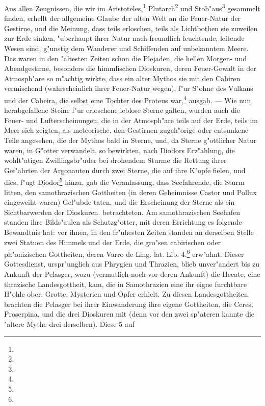 \documentclass[a4paper, 11pt, oneside, polutonikogreek, german]{article}
\begin{document}
Aus allen Zeugnissen, die wir im Aristoteles,\footnote{} Plutarch\footnote{} und Stob"aus\footnote{} gesammelt finden, erhellt der allgemeine Glaube der alten Welt an die Feuer-Natur der Gestirne, und die Meinung, dass teils erloschen, teils als Lichtbothen sie zuweilen zur Erde sinken, "uberhaupt ihrer Natur nach freundlich leuchtende, leitende Wesen sind, g"unstig dem Wanderer und Schiffenden auf unbekanntem Meere. Das waren in den "altesten Zeiten schon die Plejaden, die hellen Morgen- und Abendgestirne, besonders die himmlischen Dioskuren, deren Feuer-Gewalt in der Atmosph"are so m"achtig wirkte, dass ein alter Mythos sie mit den Cabiren vermischend (wahrscheinlich ihrer Feuer-Natur wegen), f"ur S"ohne des Vulkans und der Cabeira, die selbst eine Tochter des Proteus war,\footnote{} ausgab. --- Wie nun herabgefallene Steine f"ur erloschene leblose Sterne galten, wurden auch die Feuer- und Lufterscheinungen, die in der Atmosph"are teils auf der Erde, teils im Meer sich zeigten, als meteorische, den Gestirnen zugeh"orige oder entsunkene Teile angesehen, die der Mythos bald in Sterne, und, da Sterne g"ottlicher Natur waren, in G"otter verwandelt, so bewirkten, nach Diodors Erz"ahlung, die wohlt"atigen Zwillingsbr"uder bei drohendem Sturme die Rettung ihrer Gef"ahrten der Argonauten durch zwei Sterne, die auf ihre K"opfe fielen, und dies, f"ugt Diodor\footnote{} hinzu, gab die Veranlassung, dass Seefahrende, die Sturm litten, den samothrazischen Gottheiten (in deren Geheimnisse Castor und Pollux eingeweiht waren) Gel"ubde taten, und die Erscheinung der Sterne als ein Sichtbarwerden der Dioskuren. betrachteten. Am samothrazischen Seehafen standen ihre Bilds"aulen als Schutzg"otter, mit deren Errichtung es folgende Bewandtnis hat: vor ihnen, in den fr"uhesten Zeiten standen an derselben Stelle zwei Statuen des Himmels und der Erde, die gro"sen cabirischen oder ph"onizischen Gottheiten, deren Varro de Ling. lat. Lib. 4.\footnote{} erw"ahnt. Dieser Gottesdienst, urspr"unglich aus Phrygien und Thrazien, blieb unver"andert bis zu Ankunft der Pelasger, wozu (vermutlich noch vor deren Ankunft) die Hecate, eine thrazische Landesgottheit, kam, die in Samothrazien eine ihr eigne furchtbare H"ohle ober. Grotte, Mysterien und Opfer erhielt. Zu diesen Landesgottheiten brachten die Pelasger bei ihrer Einwanderung ihre eigene Gottheiten, die Ceres, Proserpina, und die drei Dioskuren mit (denn vor den zwei sp"ateren kannte die "altere Mythe drei derselben). Diese 5 auf 
\end{document}
